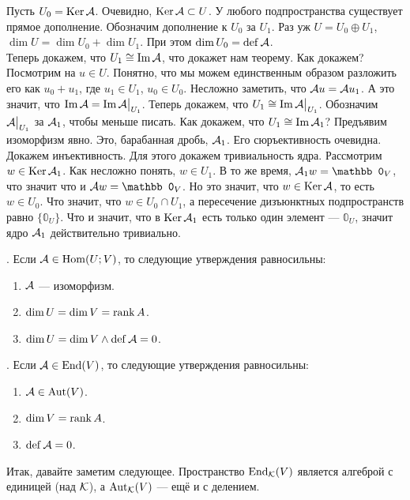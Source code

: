 \documentclass{article}
\DeclareMathOperator{\operIm}{Im}
\let\Im\operIm
\begin{document}
\begin{itemize}
        \begin{Proof}
            Пусть $U_0=\operatorname{Ker}{\mathcal{A}}$. Очевидно, $\operatorname{Ker}{\mathcal{A}}\subset U$. У любого подпространства существует прямое дополнение. Обозначим дополнение к $U_0$ за $U_1$. Раз уж $U=U_0\oplus U_1$, $\dim U=\dim U_0+\dim U_1$. При этом $\dim U_0=\operatorname{def}{\mathcal{A}}$.\\
            Теперь докажем, что $U_1\cong\Im\scriptA$, что докажет нам теорему. Как докажем? Посмотрим на $u\in U$. Понятно, что мы можем единственным образом разложить его как $u_0+u_1$, где $u_1\in U_1$, $u_0\in U_0$. Несложно заметить, что ${\mathcal{A}} u={\mathcal{A}} u_1$. А это значит, что $\Im\scriptA=\Im\scriptA\big|_{U_1}$. Теперь докажем, что $U_1\cong\Im\scriptA\big|_{U_1}$. Обозначим ${\mathcal{A}}\big|_{U_1}$ за ${\mathcal{A}}_1$, чтобы меньше писать. Как докажем, что $U_1\cong\Im\scriptA_1$? Предъявим изоморфизм явно. Это, барабанная дробь, ${\mathcal{A}}_1$. Его сюръективность очевидна. Докажем инъективность. Для этого докажем тривиальность ядра. Рассмотрим $w\in\operatorname{Ker}{\mathcal{A}}_1$. Как несложно понять, $w\in U_1$. В то же время, $\scriptA_1w=\mathbb0_V$, что значит что и $\scriptA w=\mathbb0_V$. Но это значит, что $w\in\operatorname{Ker}{\mathcal{A}}$, то есть $w\in U_0$. Что значит, что $w\in U_0\cap U_1$, а пересечение дизъюнктных подпространств равно $\{\mathbb0_U\}$. Что и значит, что в $\operatorname{Ker}{\mathcal{A}}_1$ есть только один элемент --- $\mathbb0_U$, значит ядро ${\mathcal{A}}_1$ действительно тривиально.
        \end{Proof}
        \thm {}. Если ${\mathcal{A}}\in\operatorname{Hom}(U;V)$, то следующие утверждения равносильны:
        \begin{enumerate}
            \item ${\mathcal{A}}$ --- изоморфизм.
            \item $\dim U=\dim V=\operatorname{rank} A$.
            \item $\dim U=\dim V\land\operatorname{def}{\mathcal{A}}=0$.
        \end{enumerate}
        \thm {}. Если ${\mathcal{A}}\in\operatorname{End}(V)$, то следующие утверждения равносильны:
        \begin{enumerate}
            \item ${\mathcal{A}}\in\operatorname{Aut}(V)$.
            \item $\dim V=\operatorname{rank} A$.
            \item $\operatorname{def}{\mathcal{A}}=0$.
        \end{enumerate}
        \begin{Comment}
            Итак, давайте заметим следующее. Пространство $\operatorname{End}_{\mathcal{K}}(V)$ является алгеброй с единицей (над ${\mathcal{K}}$), а $\operatorname{Aut}_{\mathcal{K}}(V)$ --- ещё и с делением.
        \end{Comment}
    \end{itemize}
\end{document}
